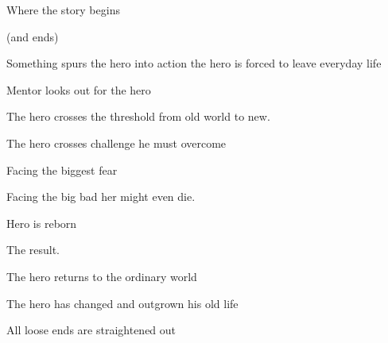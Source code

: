 


\noindent Where the story begins 

\noindent(and ends) 


\noindent Something spurs the hero into action the hero is forced to leave everyday life 


\noindent Mentor looks out for the hero  


\noindent The hero crosses the threshold from old world to new. 


\noindent The hero crosses challenge he must overcome 


\noindent Facing the biggest fear 


\noindent Facing the big bad her might even die. 


\noindent Hero is reborn 


\noindent The result. 


\noindent The hero returns to the ordinary world 


\noindent The hero has changed and outgrown his old life 


\noindent All loose ends are straightened out 


